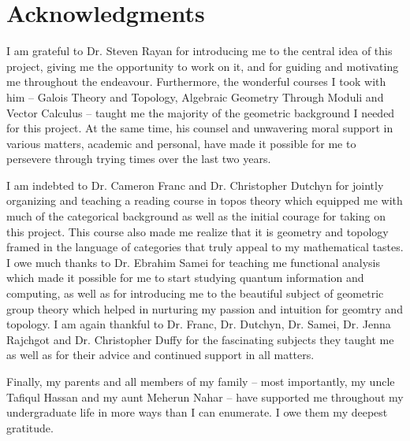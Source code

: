 
\pagebreak

\thispagestyle{frontstyle}

\section*{Acknowledgments}

I am grateful to Dr. Steven Rayan for introducing me to the central idea of this
project, giving me the opportunity to work on it, and for guiding and motivating
me throughout the endeavour. Furthermore, the wonderful courses I took with him
-- Galois Theory and Topology, Algebraic Geometry Through Moduli and Vector
Calculus -- taught me the majority of the geometric background I needed for this
project. At the same time, his counsel and unwavering moral support in various
matters, academic and personal, have made it possible for me to persevere
through trying times over the last two years.

I am indebted to Dr. Cameron Franc and Dr. Christopher Dutchyn for jointly
organizing and teaching a reading course in topos theory which equipped me with
much of the categorical background as well as the initial courage for taking on
this project. This course also made me realize that it is geometry and topology
framed in the language of categories that truly appeal to my mathematical
tastes. I owe much thanks to Dr. Ebrahim Samei for teaching me functional
analysis which made it possible for me to start studying quantum information and
computing, as well as for introducing me to the beautiful subject of geometric
group theory which helped in nurturing my passion and intuition for geomtry and
topology. I am again thankful to Dr. Franc, Dr. Dutchyn, Dr. Samei, Dr. Jenna
Rajchgot and Dr. Christopher Duffy for the fascinating subjects they taught me
as well as for their advice and continued support in all matters.

Finally, my parents and all members of my family -- most importantly, my uncle
Tafiqul Hassan and my aunt Meherun Nahar -- have supported me throughout my
undergraduate life in more ways than I can enumerate. I owe them my deepest
gratitude.

